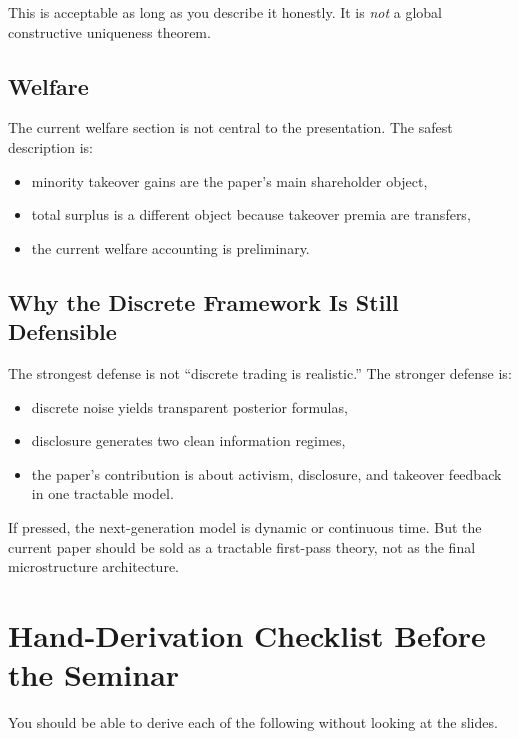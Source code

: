 \documentclass[11pt,a4paper]{article}
\theoremstyle{definition}
\theoremstyle{plain}
\theoremstyle{remark}
\newcommand{\1}{\mathbf{1}}
\begin{document}
This is acceptable as long as you describe it honestly. It is \emph{not} a global constructive uniqueness theorem.

\subsection{Welfare}

The current welfare section is not central to the presentation. The safest description is:
\begin{itemize}
\item minority takeover gains are the paper's main shareholder object,
\item total surplus is a different object because takeover premia are transfers,
\item the current welfare accounting is preliminary.
\end{itemize}

\subsection{Why the Discrete Framework Is Still Defensible}

The strongest defense is not ``discrete trading is realistic.'' The stronger defense is:
\begin{itemize}
\item discrete noise yields transparent posterior formulas,
\item disclosure generates two clean information regimes,
\item the paper's contribution is about activism, disclosure, and takeover feedback in one tractable model.
\end{itemize}

If pressed, the next-generation model is dynamic or continuous time. But the current paper should be sold as a tractable first-pass theory, not as the final microstructure architecture.

\section{Hand-Derivation Checklist Before the Seminar}

You should be able to derive each of the following without looking at the slides.
\end{document}
